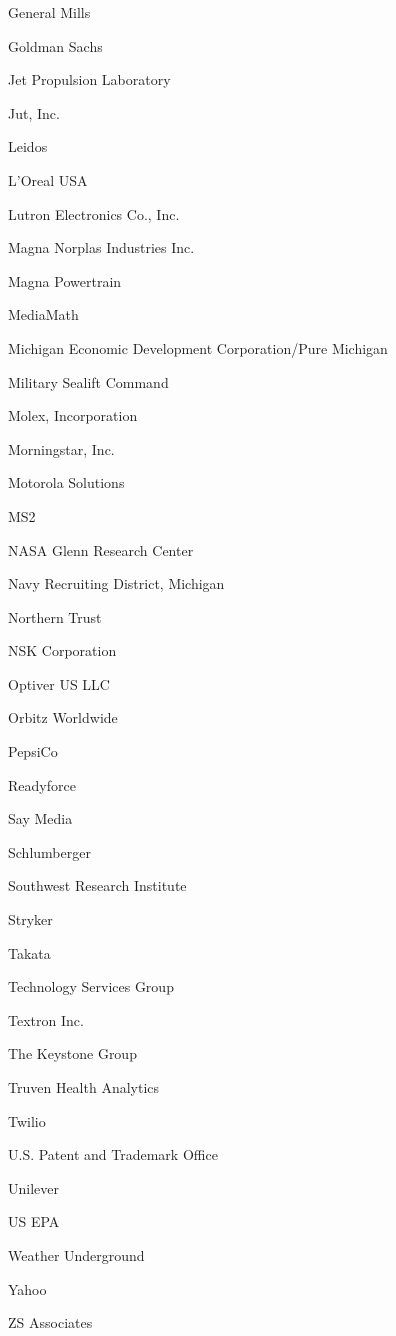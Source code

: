 \documentclass[twoside]{article}
\begin{document}
\begin{center}
\begin{multicols}{5}
\begin{FlushLeft}
\begin{compactitem}
\item General Mills
\item Goldman Sachs
\item Jet Propulsion Laboratory
\item Jut, Inc.
\item Leidos
\item L'Oreal USA
\item Lutron Electronics Co., Inc.
\item Magna Norplas Industries Inc.
\item Magna Powertrain
\item MediaMath
\item Michigan Economic Development Corporation/Pure Michigan
\item Military Sealift Command
\item Molex, Incorporation
\item Morningstar, Inc.
\item Motorola Solutions
\item MS2
\item NASA Glenn Research Center
\item Navy Recruiting District, Michigan
\item Northern Trust
\item NSK Corporation
\item Optiver US LLC
\item Orbitz Worldwide
\item PepsiCo
\item Readyforce
\item Say Media
\item Schlumberger
\item Southwest Research Institute
\item Stryker
\item Takata
\item Technology Services Group
\item Textron Inc.
\item The Keystone Group
\item Truven Health Analytics
\item Twilio
\item U.S. Patent and Trademark Office
\item Unilever
\item US EPA
\item Weather Underground
\item Yahoo
\item ZS Associates
\end{compactitem}
        \end{FlushLeft}

\end{multicols}
\end{center}
\end{document}
